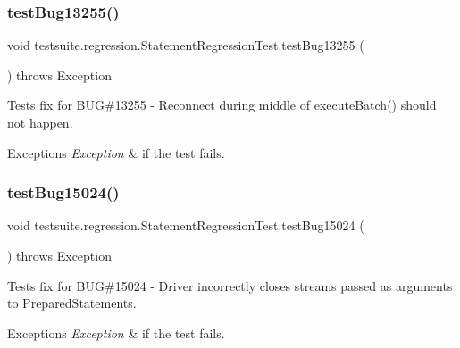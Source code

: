 \subsubsection{\texorpdfstring{test\+Bug13255()}{testBug13255()}}
{\footnotesize\ttfamily void testsuite.\+regression.\+Statement\+Regression\+Test.\+test\+Bug13255 (\begin{DoxyParamCaption}{ }\end{DoxyParamCaption}) throws Exception}

Tests fix for B\+UG\#13255 -\/ Reconnect during middle of execute\+Batch() should not happen.


\begin{DoxyExceptions}{Exceptions}
{\em Exception} & if the test fails. \\
\hline
\end{DoxyExceptions}
\mbox{\label{classtestsuite_1_1regression_1_1_statement_regression_test_a91138e5fec8feb1b3680bca0bad7700d}} 
\subsubsection{\texorpdfstring{test\+Bug15024()}{testBug15024()}}
{\footnotesize\ttfamily void testsuite.\+regression.\+Statement\+Regression\+Test.\+test\+Bug15024 (\begin{DoxyParamCaption}{ }\end{DoxyParamCaption}) throws Exception}

Tests fix for B\+UG\#15024 -\/ Driver incorrectly closes streams passed as arguments to Prepared\+Statements.


\begin{DoxyExceptions}{Exceptions}
{\em Exception} & if the test fails. \\
\hline
\end{DoxyExceptions}
\mbox{\label{classtestsuite_1_1regression_1_1_statement_regression_test_a8a46a6b40cf258db53a37cc247872520}} 
